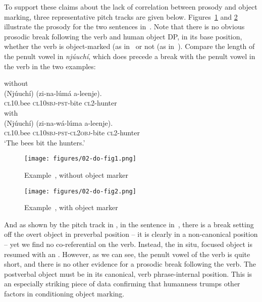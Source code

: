 \documentclass[output=paper]{LSP/langsci}
\begin{document}
To support these claims about the lack of correlation between prosody and object marking, three representative pitch tracks are given below. 
Figures~\ref{fig:1} and \ref{fig:2} illustrate the prosody for the two sentences in~. Note that there is no obvious prosodic break following the verb and human object DP, in its base position, whether the verb is object-marked (as in~ or not (as in~). 
Compare the length of the penult vowel in \textit{njúuchí}, which does precede a break with the penult vowel in the verb in the two examples:

\begin{exe}
\ex
\label{02-do-ex:30}
\begin{xlist}
\ex
\label{02-do-ex:30a}
without \\
\gll	(Njúuchí) 	(zi-na-lúmá 		a-leenje).\\
\textsc{cl10}.bee		\textsc{cl10sbj}-\textsc{pst}-bite	\textsc{cl2}-hunter\\
\ex
\label{02-do-ex:30b}
with \\
\gll	(Njúuchí) 	(zi-na-wá-lúma 			a-leenje).\\
\textsc{cl10}.bee		\textsc{cl10sbj}-\textsc{pst}-\textsc{cl2obj}-bite	\textsc{cl2}-hunter\\
\glt ‘The bees bit the hunters.’
\end{xlist}
\end{exe}

\begin{figure}[th]
\texttt{[image: figures/02-do-fig1.png]}
\caption{Example~, without object marker}
\label{fig:1}
\end{figure}

\begin{figure}[th]
\texttt{[image: figures/02-do-fig2.png]}
\caption{Example~, with object marker}
\label{fig:2}
\end{figure}

And as shown by the pitch track in , in the sentence
in~, there is a break setting off the overt object in
preverbal position – it is clearly in a non-canonical position – yet
we find no co-referential  on the verb. Instead, the in
situ, focused object is resumed with an . However, as we
can see, the penult vowel of the verb is quite short, and there is no
other evidence for a prosodic break following the verb. The postverbal
object must be in its canonical, verb phrase-internal position. This
is an especially striking piece of data confirming that humanness
trumps other factors in conditioning object marking.
\end{document}
